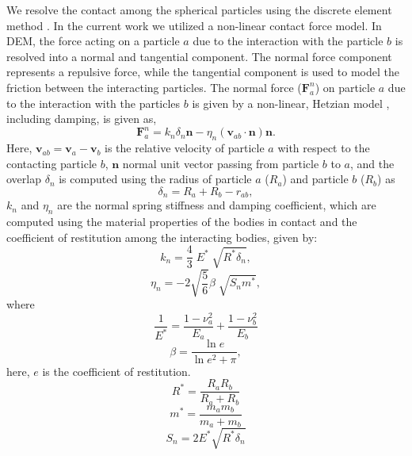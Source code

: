 \documentclass[preprint,12pt]{elsarticle}
\newcommand{\teng}[1]{\ensuremath{\boldsymbol{#1}}}
\newcommand{\ten}[1]{\ensuremath{\mathbf{#1}}}
\begin{document}
We resolve the contact among the spherical particles using the discrete
element method \cite{luding_dem_2008}. In the current work we utilized a
non-linear contact force model. In DEM, the force acting on a particle $a$ due
to the interaction with the particle $b$ is resolved into a normal and
tangential component. The normal force component represents a repulsive force,
while the tangential component is used to model the friction between the
interacting particles.  The normal force ($\teng{F}_a^{n}$) on particle $a$
due to the interaction with the particles $b$ is given by a non-linear,
Hetzian model \cite{brilliantov1996model}, including damping, is given as,
\begin{equation}
  \label{eq:contact-algorithm-normal}
  \ten{F}_a^n = k_n \delta_{n} \ten{n} - \eta_n (\ten{v}_{ab} \cdot \ten{n}) \ten{n}.
\end{equation}
Here, $\ten{v}_{ab} = \ten{v}_{a} - \ten{v}_b$ is the relative velocity of
particle $a$ with respect to the contacting particle $b$,
$\ten{n}$ normal unit vector passing from particle $b$ to $a$, and the overlap $\delta_{n}$ is computed
using the radius of particle $a$ ($R_a$) and particle $b$ ($R_b$) as
\begin{equation}
  \label{eq:cf-overlap}
  \delta_{n} = R_{a} + R_{b} - r_{ab},
\end{equation}
$k_n$ and $\eta_n$ are the normal spring stiffness and damping coefficient, which
are computed using the material properties of the bodies in contact and the
coefficient of restitution among the interacting bodies, given by:
\begin{equation}
  \label{eq:kf-stiffness}
  k_n = \frac{4}{3} \; E^{*} \; \sqrt{R^{*} \delta_n},
\end{equation}
\begin{equation}
  \label{eq:kf-stiffness}
  \eta_n = -2 \sqrt{\frac{5}{6}} \beta \; \sqrt{S_n m^*},
\end{equation}
where
\begin{equation}
  \label{eq:kf-stiffness}
  \frac{1}{E^{*}} = \frac{1 -\nu_a^2}{E_a} + \frac{1 -\nu_b^2}{E_b}
\end{equation}
\begin{equation}
  \label{eq:kf-stiffness}
  \beta = \frac{\ln{e}}{\ln{e}^2 + \pi},
\end{equation}
here, $e$ is the coefficient of restitution.
\begin{equation}
  \label{eq:kf-stiffness}
  R^{*} = \frac{R_a R_b}{R_a + R_b}
\end{equation}
\begin{equation}
  \label{eq:kf-stiffness}
  m^{*} = \frac{m_a m_b}{m_a + m_b}
\end{equation}
\begin{equation}
  \label{eq:kf-stiffness}
  S_n = 2 E^{*} \sqrt{R^{*} \delta_n}
\end{equation}
\end{document}
